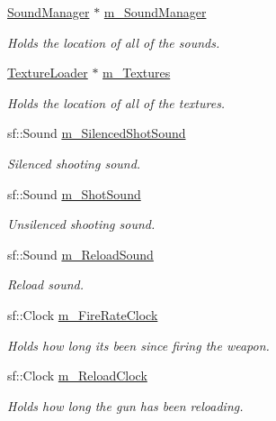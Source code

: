 \begin{DoxyCompactItemize}
\item 
\hyperlink{class_sound_manager}{Sound\+Manager} $\ast$ \hyperlink{class_weapon_af882c79f972fa2586c755c465897d8d1}{m\+\_\+\+Sound\+Manager}
\begin{DoxyCompactList}\small\item\em Holds the location of all of the sounds. \end{DoxyCompactList}\item 
\hyperlink{class_texture_loader}{Texture\+Loader} $\ast$ \hyperlink{class_weapon_a13010172b849a0f6cd1e1550ea6a93f9}{m\+\_\+\+Textures}
\begin{DoxyCompactList}\small\item\em Holds the location of all of the textures. \end{DoxyCompactList}\item 
sf\+::\+Sound \hyperlink{class_weapon_ac3432f05ffea90c948475ccd57450abe}{m\+\_\+\+Silenced\+Shot\+Sound}
\begin{DoxyCompactList}\small\item\em Silenced shooting sound. \end{DoxyCompactList}\item 
sf\+::\+Sound \hyperlink{class_weapon_a6c627e9e8d2e6d9a84be5c69f6bc5dd4}{m\+\_\+\+Shot\+Sound}
\begin{DoxyCompactList}\small\item\em Unsilenced shooting sound. \end{DoxyCompactList}\item 
sf\+::\+Sound \hyperlink{class_weapon_a6c8e69ad05b67ff47f92ac0df6585855}{m\+\_\+\+Reload\+Sound}
\begin{DoxyCompactList}\small\item\em Reload sound. \end{DoxyCompactList}\item 
sf\+::\+Clock \hyperlink{class_weapon_a8c10adce53bd2a913f7c74f95e72b711}{m\+\_\+\+Fire\+Rate\+Clock}
\begin{DoxyCompactList}\small\item\em Holds how long its been since firing the weapon. \end{DoxyCompactList}\item 
sf\+::\+Clock \hyperlink{class_weapon_a639e1d2691ac099666445e9b074c2c3a}{m\+\_\+\+Reload\+Clock}
\begin{DoxyCompactList}\small\item\em Holds how long the gun has been reloading. \end{DoxyCompactList}\item 

\end{DoxyCompactItemize}

